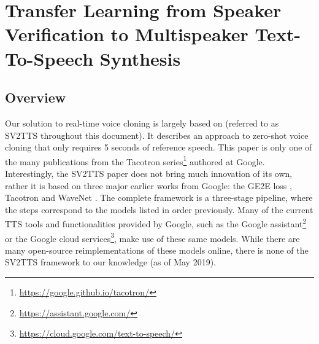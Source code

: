 \documentclass[a4paper, oneside, 12pt, english]{article}
\begin{document}

\section{Transfer Learning from Speaker Verification to Multispeaker Text-To-Speech Synthesis}
\subsection{Overview}
Our solution to real-time voice cloning is largely based on \citep{SV2TTS} (referred to as SV2TTS throughout this document). It describes an approach to zero-shot voice cloning that only requires 5 seconds of reference speech. This paper is only one of the many publications from the Tacotron series\footnote{\url{https://google.github.io/tacotron/}} authored at Google. Interestingly, the SV2TTS paper does not bring much innovation of its own, rather it is based on three major earlier works from Google: the GE2E loss \citep{GE2E}, Tacotron \citep{Tacotron1} and WaveNet \citep{WaveNet}. The complete framework is a three-stage pipeline, where the steps correspond to the models listed in order previously. Many of the current TTS tools and functionalities provided by Google, such as the Google assistant\footnote{\url{https://assistant.google.com/}} or the Google cloud services\footnote{\url{https://cloud.google.com/text-to-speech/}}, make use of these same models. While there are many open-source reimplementations of these models online, there is none of the SV2TTS framework to our knowledge (as of May 2019).
\end{document}
